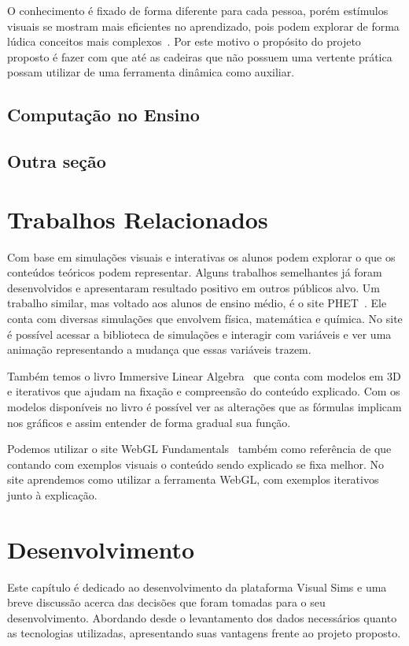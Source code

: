 \documentclass[tcc,capa]{texufpel}
\begin{document}
O conhecimento é fixado de forma diferente para cada pessoa, porém estímulos visuais se mostram mais eficientes no aprendizado, pois podem explorar de forma lúdica conceitos mais complexos~\cite{klawe1999computer}. Por este motivo o propósito do projeto proposto é fazer com que até as cadeiras que não possuem uma vertente prática possam utilizar de uma ferramenta dinâmica como auxiliar.

\section{Computação no Ensino}
\section{Outra seção}

\chapter{Trabalhos Relacionados}

Com base em simulações visuais e interativas os alunos podem explorar o que os conteúdos teóricos podem representar. Alguns trabalhos semelhantes já foram desenvolvidos e apresentaram resultado positivo em outros públicos alvo. Um trabalho similar, mas voltado aos alunos de ensino médio, é o site PHET~\cite{phet_2002}. Ele conta com diversas simulações que envolvem física, matemática e química. No site é possível acessar a biblioteca de simulações e interagir com variáveis e ver uma animação representando a mudança que essas variáveis trazem. 

Também temos o livro Immersive Linear Algebra~\cite{strom2017immersive} que conta com modelos em 3D e iterativos que ajudam na fixação e compreensão do conteúdo explicado. Com os modelos disponíveis no livro é possível ver as alterações que as fórmulas implicam nos gráficos e assim entender de forma gradual sua função.

Podemos utilizar o site WebGL Fundamentals~\cite{webgl_2017} também como referência de que contando com exemplos visuais o conteúdo sendo explicado se fixa melhor. No site aprendemos como utilizar a ferramenta WebGL, com exemplos iterativos junto à explicação.

\chapter{Desenvolvimento}

Este capítulo é dedicado ao desenvolvimento da plataforma Visual Sims e uma breve discussão acerca das decisões que foram tomadas para o seu desenvolvimento. Abordando desde o levantamento dos dados necessários quanto as tecnologias utilizadas, apresentando suas vantagens frente ao projeto proposto.
\end{document}

